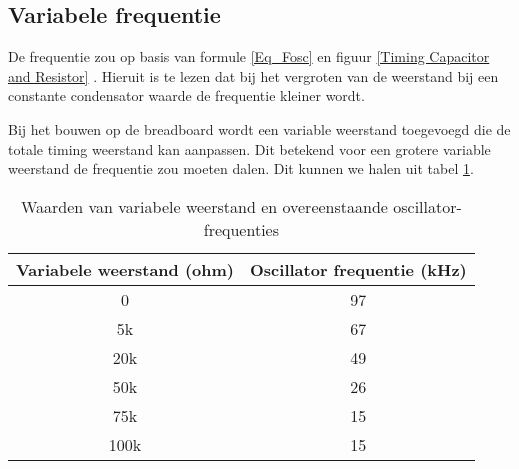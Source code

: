 \subsection{Variabele frequentie}
De frequentie zou op basis van formule \ref{Eq_Fosc} en figuur \ref{Timing Capacitor and Resistor} .
Hieruit is te lezen dat bij het vergroten van de weerstand bij een constante condensator waarde de frequentie kleiner wordt.


Bij het bouwen op de breadboard wordt een variable weerstand toegevoegd die de totale timing weerstand kan aanpassen. Dit betekend voor een grotere variable weerstand de frequentie zou moeten dalen. Dit kunnen we halen uit tabel \ref{tab:oscillator_frequentie}. 

\begin{table}[h!]
\centering
\begin{tabular}{|c|c|}
\hline
\textbf{Variabele weerstand (ohm)} & \textbf{Oscillator frequentie (kHz)} \\ \hline
0 & 97 \\ \hline
5k & 67 \\ \hline
20k & 49 \\ \hline
50k & 26 \\ \hline
75k & 15 \\ \hline
100k & 15 \\ \hline
\end{tabular}
\caption{Waarden van variabele weerstand en overeenstaande oscillator-frequenties}
\label{tab:oscillator_frequentie}
\end{table}
